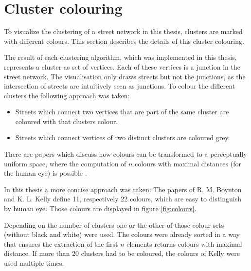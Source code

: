 \documentclass[11pt, a4paper]{report}
\begin{document}
\section{Cluster colouring}
To visualize the clustering of a street network in this thesis, clusters are marked with different colours. This section describes the details of this cluster colouring.

The result of each clustering algorithm, which was implemented in this thesis, represents a cluster as set of vertices. Each of these vertices is a junction in the street network. The visualisation only draws streets but not the junctions, as the intersection of streets are intuitively seen as junctions. To colour the different clusters the following approach was taken:

\begin{itemize}
    \item Streets which connect two vertices that are part of the same cluster are coloured with that clusters colour.
    \item Streets which connect vertices of two distinct clusters are coloured grey.
\end{itemize}

There are papers which discuss how colours can be transformed to a perceptually uniform space, where the computation of $n$ colours with maximal distances (for the human eye) is possible \cite{colors:2006}.

In this thesis a more concise approach was taken: The papers of R. M. Boynton \cite{boynton:1989} and K. L. Kelly \cite{kelly:1965} define 11, respectively 22 colours, which are easy to distinguish by human eye. Those colours are displayed in figure \ref{fig:colours}.

Depending on the number of clusters one or the other of those colour sets (without black and white) were used. The colours were already sorted in a way that ensures the extraction of the first $n$ elements returns colours with maximal distance. If more than 20 clusters had to be coloured, the colours of Kelly were used multiple times.
\end{document}
